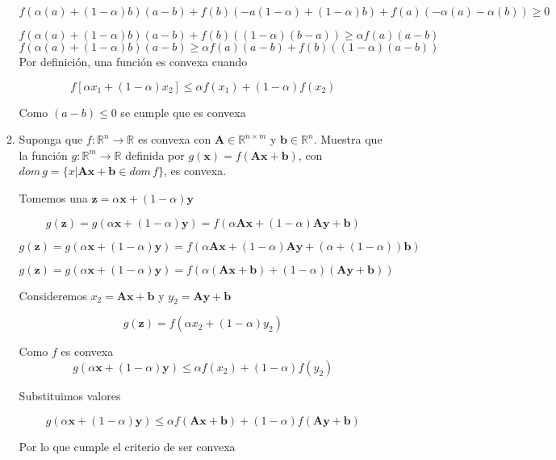 \documentclass{article}
\begin{document}
\begin{enumerate}
\begin{enumerate}
$$ f(\alpha (a) + (1-\alpha)b)(a - b) + f(b)(-a(1-\alpha)+ (1-\alpha)b) + f(a)(-\alpha (a) - \alpha (b)) \geq 0$$

$$ f(\alpha (a) + (1-\alpha)b)(a - b) + f(b)((1-\alpha)(b-a)) \geq \alpha f(a)(a - b)$$
$$ f(\alpha (a) + (1-\alpha)b)(a - b) \geq \alpha f(a)(a - b) + f(b)((1-\alpha)(a - b))$$
Por definición, una función es convexa cuando

$$f[\alpha x_1 + (1 - \alpha)x_2] \leq \alpha f(x_1) + (1 - \alpha)f(x_2)$$

Como $(a - b) \leq 0$ se cumple que es convexa

\item Suponga que $f : \mathbb{R}^n \rightarrow \mathbb{R}$ es convexa con $\boldsymbol{A} \in \mathbb{R}^{n\times m}$ y $\boldsymbol{b} \in \mathbb{R}^n$. Muestra que la función $g: \mathbb{R}^m \rightarrow \mathbb{R}$ definida por $g(\boldsymbol{x}) = f(\boldsymbol{Ax}+\boldsymbol{b})$, con $dom \,g = \{x |\boldsymbol{Ax}+\boldsymbol{b} \in dom \,f\}$, es convexa.

Tomemos una $\boldsymbol{z} = \alpha \boldsymbol{x} + (1-\alpha )\boldsymbol{y}$

$$g(\boldsymbol{z}) = g(\alpha \boldsymbol{x} + (1-\alpha )\boldsymbol{y}) = f(\alpha \boldsymbol{Ax} + (1-\alpha )\boldsymbol{Ay} + \boldsymbol{b})$$

$$g(\boldsymbol{z}) = g(\alpha \boldsymbol{x} + (1-\alpha )\boldsymbol{y}) = f(\alpha \boldsymbol{Ax} + (1-\alpha )\boldsymbol{Ay} + (\alpha +(1-\alpha))\boldsymbol{b})$$

$$g(\boldsymbol{z}) = g(\alpha \boldsymbol{x} + (1-\alpha )\boldsymbol{y}) = f(\alpha (\boldsymbol{Ax}+ \boldsymbol{b}) + (1-\alpha )(\boldsymbol{Ay} + \boldsymbol{b}))$$

Consideremos $x_2 = \boldsymbol{Ax} + \boldsymbol{b}$ y $y_2 = \boldsymbol{Ay} + \boldsymbol{b}$

$$g(\boldsymbol{z}) = f(\alpha x_2 + (1-\alpha)y_2)$$

Como $f $ es convexa
$$g(\alpha \boldsymbol{x} + (1-\alpha )\boldsymbol{y}) \leq \alpha f(x_2) + (1 - \alpha)f(y_2)$$

Substituimos valores

$$g(\alpha \boldsymbol{x} + (1-\alpha )\boldsymbol{y}) \leq \alpha f(\boldsymbol{Ax} + \boldsymbol{b}) + (1 - \alpha)f(\boldsymbol{Ay} + \boldsymbol{b})$$

Por lo que cumple el criterio de ser convexa

\end{enumerate}

\end{enumerate}
\end{document}
